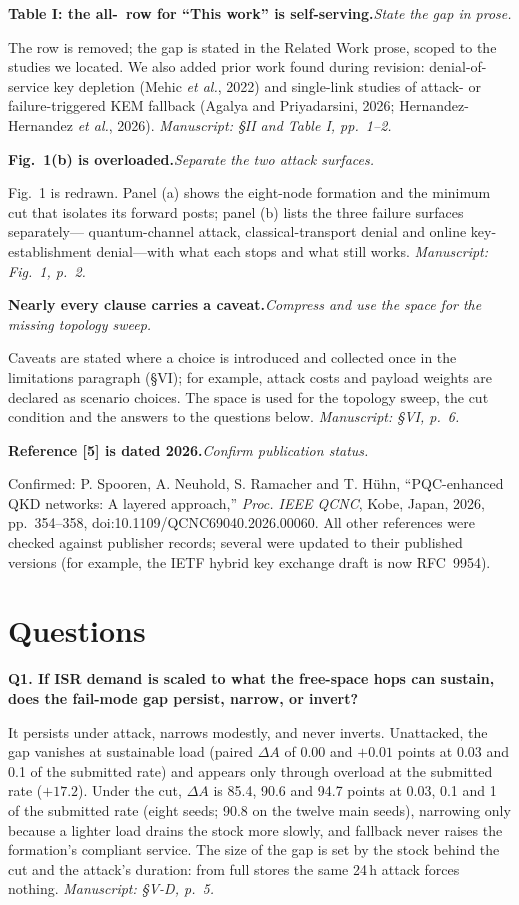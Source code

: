 \documentclass[10pt,a4paper]{article}
\newcommand{\loc}[1]{\textit{Manuscript: #1.}}
\newcommand{\comment}[2]{\par\medskip\noindent\textbf{#1}\hspace{0.4em}\textit{#2}\par}
\begin{document}
\comment{Table I: the all-\checkmark\ row for ``This work'' is self-serving.}{State the gap in prose.}
The row is removed; the gap is stated in the Related Work prose, scoped to the studies
we located. We also added prior work found during revision: denial-of-service key
depletion (Mehic \emph{et al.}, 2022) and single-link studies of attack- or
failure-triggered KEM fallback (Agalya and Priyadarsini, 2026; Hernandez-Hernandez
\emph{et al.}, 2026).
\loc{\S II and Table I, pp.~1--2}

\comment{Fig.~1(b) is overloaded.}{Separate the two attack surfaces.}
Fig.~1 is redrawn. Panel (a) shows the eight-node formation and the minimum cut that
isolates its forward posts; panel (b) lists the three failure surfaces separately---
quantum-channel attack, classical-transport denial and online key-establishment
denial---with what each stops and what still works.
\loc{Fig.~1, p.~2}

\comment{Nearly every clause carries a caveat.}{Compress and use the space for the missing topology sweep.}
Caveats are stated where a choice is introduced and collected once in the limitations
paragraph (\S VI); for example, attack costs and payload weights are declared as
scenario choices. The space is used for the topology sweep, the cut condition and the
answers to the questions below.
\loc{\S VI, p.~6}

\comment{Reference [5] is dated 2026.}{Confirm publication status.}
Confirmed: P. Spooren, A. Neuhold, S. Ramacher and T. H\"uhn, ``PQC-enhanced QKD
networks: A layered approach,'' \emph{Proc. IEEE QCNC}, Kobe, Japan, 2026,
pp.~354--358, doi:10.1109/QCNC69040.2026.00060. All other references were checked
against publisher records; several were updated to their published versions (for
example, the IETF hybrid key exchange draft is now RFC~9954).

\section*{Questions}

\comment{Q1. If ISR demand is scaled to what the free-space hops can sustain, does the fail-mode gap persist, narrow, or invert?}{}
It persists under attack, narrows modestly, and never inverts. Unattacked, the gap
vanishes at sustainable load (paired $\Delta A$ of 0.00 and $+0.01$ points at 0.03 and
0.1 of the submitted rate) and appears only through overload at the submitted rate
($+17.2$). Under the cut, $\Delta A$ is 85.4, 90.6 and 94.7 points at 0.03, 0.1 and 1
of the submitted rate (eight seeds; 90.8 on the twelve main seeds), narrowing only
because a lighter load drains the stock more slowly, and fallback never raises the
formation's compliant service. The size of the gap is set by the stock behind the
cut and the attack's duration: from full stores the same 24\,h attack forces nothing.
\loc{\S V-D, p.~5}
\end{document}
